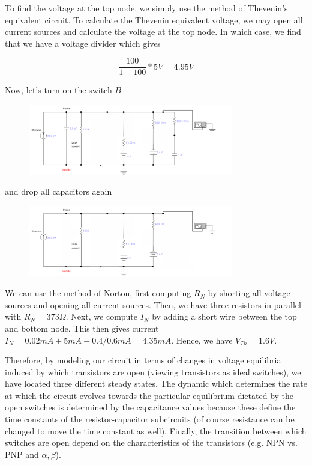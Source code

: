 \documentclass[12]{book}
\newcommand\0{\mathbf{0}}
\newcommand\<{\langle}
\renewcommand\>{\rangle}
\begin{document}
To find the voltage at the top node, we simply use the method of Thevenin's equivalent circuit\cite{fortney1987principles}. To calculate the Thevenin equivalent voltage, we may open all current sources and calculate the voltage at the top node. In which case, we find that we have a voltage divider which gives 

$$\frac{100}{1+100} * 5V = 4.95 V$$

Now, let's turn on the switch $B$
 
 \begin{figure}[h]
\includegraphics[width=0.8\textwidth]{exercise1-5}
\end{figure}

and drop all capacitors again
 
\begin{figure}[H]
\centering
\includegraphics[width=0.8\textwidth]{exercise1-6}
\end{figure}

We can use the method of Norton, first computing $R_{N}$ by shorting all voltage sources and opening all current sources. Then, we have three resistors in parallel with $R_{N} = 373 \Omega$. Next, we compute $I_N$ by adding a short wire between the top and bottom node. This then gives current $I_N = 0.02 mA + 5 mA - 0.4/0.6 mA = 4.35 mA$. Hence, we have $V_{Th} = 1.6 V$.

Therefore, by modeling our circuit in terms of changes in voltage equilibria induced by which transistors are open (viewing transistors as ideal switches), we have located three different steady states. The dynamic which determines the rate at which the circuit evolves towards the particular equilibrium dictated by the open switches is determined by the capacitance values because these define the time constants of the resistor-capacitor subcircuits (of course resistance can be changed to move the time constant as well). Finally, the transition between which switches are open depend on the characteristics of the transistors (e.g. NPN vs. PNP and $\alpha, \beta$).
\end{document}
